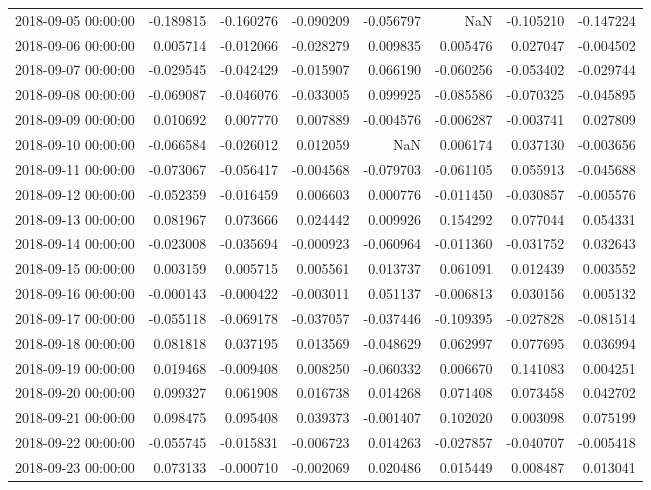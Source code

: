 \begin{tabular}{lrrrrrrr}
2018-09-05 00:00:00 & -0.189815 & -0.160276 & -0.090209 & -0.056797 & NaN & -0.105210 & -0.147224 \\
2018-09-06 00:00:00 & 0.005714 & -0.012066 & -0.028279 & 0.009835 & 0.005476 & 0.027047 & -0.004502 \\
2018-09-07 00:00:00 & -0.029545 & -0.042429 & -0.015907 & 0.066190 & -0.060256 & -0.053402 & -0.029744 \\
2018-09-08 00:00:00 & -0.069087 & -0.046076 & -0.033005 & 0.099925 & -0.085586 & -0.070325 & -0.045895 \\
2018-09-09 00:00:00 & 0.010692 & 0.007770 & 0.007889 & -0.004576 & -0.006287 & -0.003741 & 0.027809 \\
2018-09-10 00:00:00 & -0.066584 & -0.026012 & 0.012059 & NaN & 0.006174 & 0.037130 & -0.003656 \\
2018-09-11 00:00:00 & -0.073067 & -0.056417 & -0.004568 & -0.079703 & -0.061105 & 0.055913 & -0.045688 \\
2018-09-12 00:00:00 & -0.052359 & -0.016459 & 0.006603 & 0.000776 & -0.011450 & -0.030857 & -0.005576 \\
2018-09-13 00:00:00 & 0.081967 & 0.073666 & 0.024442 & 0.009926 & 0.154292 & 0.077044 & 0.054331 \\
2018-09-14 00:00:00 & -0.023008 & -0.035694 & -0.000923 & -0.060964 & -0.011360 & -0.031752 & 0.032643 \\
2018-09-15 00:00:00 & 0.003159 & 0.005715 & 0.005561 & 0.013737 & 0.061091 & 0.012439 & 0.003552 \\
2018-09-16 00:00:00 & -0.000143 & -0.000422 & -0.003011 & 0.051137 & -0.006813 & 0.030156 & 0.005132 \\
2018-09-17 00:00:00 & -0.055118 & -0.069178 & -0.037057 & -0.037446 & -0.109395 & -0.027828 & -0.081514 \\
2018-09-18 00:00:00 & 0.081818 & 0.037195 & 0.013569 & -0.048629 & 0.062997 & 0.077695 & 0.036994 \\
2018-09-19 00:00:00 & 0.019468 & -0.009408 & 0.008250 & -0.060332 & 0.006670 & 0.141083 & 0.004251 \\
2018-09-20 00:00:00 & 0.099327 & 0.061908 & 0.016738 & 0.014268 & 0.071408 & 0.073458 & 0.042702 \\
2018-09-21 00:00:00 & 0.098475 & 0.095408 & 0.039373 & -0.001407 & 0.102020 & 0.003098 & 0.075199 \\
2018-09-22 00:00:00 & -0.055745 & -0.015831 & -0.006723 & 0.014263 & -0.027857 & -0.040707 & -0.005418 \\
2018-09-23 00:00:00 & 0.073133 & -0.000710 & -0.002069 & 0.020486 & 0.015449 & 0.008487 & 0.013041 \\

\end{tabular}
